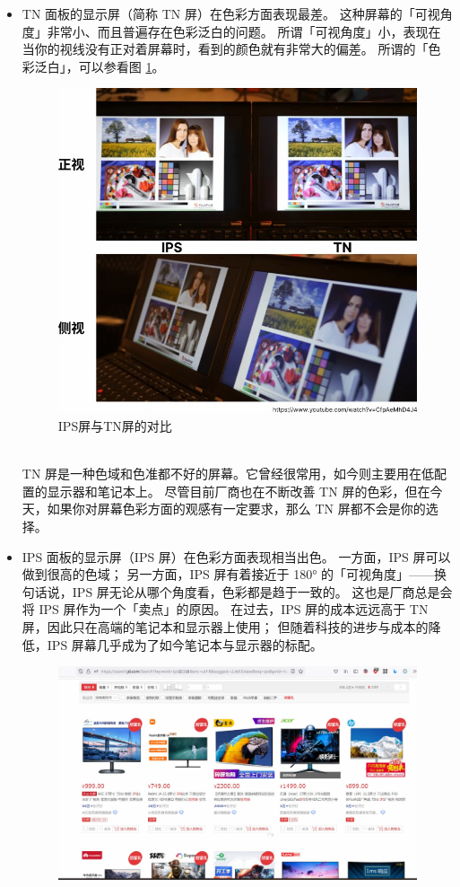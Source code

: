 \begin{itemize}
  \item TN 面板的显示屏（简称 TN 屏）在色彩方面表现最差。
    这种屏幕的「可视角度」非常小、而且普遍存在色彩泛白的问题。
    所谓「可视角度」小，表现在当你的视线没有正对着屏幕时，看到的颜色就有非常大的偏差。
    所谓的「色彩泛白」，可以参看图 \ref{IPS_vs_TN}。
    \begin{figure}[htb!]
      \centering
      \includegraphics[width=11cm]{assets/IPS_vs_TN.jpg}
      \caption{IPS屏与TN屏的对比}
      \label{IPS_vs_TN}
    \end{figure}\\
    TN 屏是一种色域和色准都不好的屏幕。它曾经很常用，如今则主要用在低配置的显示器和笔记本上。
    尽管目前厂商也在不断改善 TN 屏的色彩，但在今天，如果你对屏幕色彩方面的观感有一定要求，那么 TN 屏都不会是你的选择。
  \item IPS 面板的显示屏（IPS 屏）在色彩方面表现相当出色。
    一方面，IPS 屏可以做到很高的色域；
    另一方面，IPS 屏有着接近于 180° 的「可视角度」——换句话说，IPS 屏无论从哪个角度看，色彩都是趋于一致的。
    这也是厂商总是会将 IPS 屏作为一个「卖点」的原因。
    在过去，IPS 屏的成本远远高于 TN 屏，因此只在高端的笔记本和显示器上使用；
    但随着科技的进步与成本的降低，IPS 屏幕几乎成为了如今笔记本与显示器的标配。
    \begin{figure}[htb!]
      \centering
      \includegraphics[width=13cm]{assets/IPS_at_Low_Price.jpg}

\end{figure}
\end{itemize}

